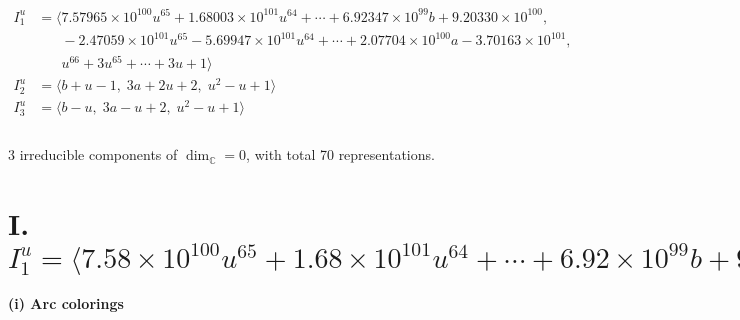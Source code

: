 \documentclass[1p]{elsarticle_modified}
\theoremstyle{definition}
\begin{document}
\begin{align*}
I^u_{1}&=\langle 
7.57965\times10^{100} u^{65}+1.68003\times10^{101} u^{64}+\cdots+6.92347\times10^{99} b+9.20330\times10^{100},\\
\phantom{I^u_{1}}&\phantom{= \langle  }-2.47059\times10^{101} u^{65}-5.69947\times10^{101} u^{64}+\cdots+2.07704\times10^{100} a-3.70163\times10^{101},\\
\phantom{I^u_{1}}&\phantom{= \langle  }u^{66}+3 u^{65}+\cdots+3 u+1\rangle \\
I^u_{2}&=\langle 
b+u-1,\;3 a+2 u+2,\;u^2- u+1\rangle \\
I^u_{3}&=\langle 
b- u,\;3 a- u+2,\;u^2- u+1\rangle \\
\\
\end{align*}
\raggedright * 3 irreducible components of $\dim_{\mathbb{C}}=0$, with total 70 representations.\\
\newpage
\renewcommand{\arraystretch}{1}
\centering \section*{I. $I^u_{1}= \langle 7.58\times10^{100} u^{65}+1.68\times10^{101} u^{64}+\cdots+6.92\times10^{99} b+9.20\times10^{100},\;-2.47\times10^{101} u^{65}-5.70\times10^{101} u^{64}+\cdots+2.08\times10^{100} a-3.70\times10^{101},\;u^{66}+3 u^{65}+\cdots+3 u+1 \rangle$}
\flushleft \textbf{(i) Arc colorings}\\
\end{document}

